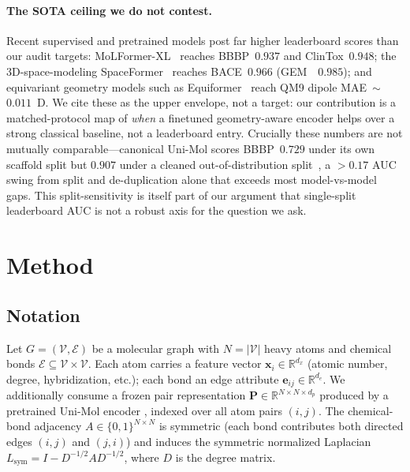 \documentclass[sigconf,nonacm,anonymous,review]{acmart}
\begin{document}
\paragraph{The SOTA ceiling we do not contest.}
Recent supervised and pretrained models post far higher leaderboard scores than our audit targets: MoLFormer-XL~\cite{ross2022molformer} reaches BBBP~$0.937$ and ClinTox~$0.948$; the 3D-space-modeling SpaceFormer~\cite{lu2025spaceformer} reaches BACE~$0.966$ (GEM~\cite{fang2022gem}~$0.985$); and equivariant geometry models such as Equiformer~\cite{liao2023equiformer} reach QM9 dipole MAE~$\sim$$0.011$~D. We cite these as the upper envelope, not a target: our contribution is a matched-protocol map of \emph{when} a finetuned geometry-aware encoder helps over a strong classical baseline, not a leaderboard entry. Crucially these numbers are not mutually comparable---canonical Uni-Mol scores BBBP~$0.729$ under its own scaffold split but $0.907$ under a cleaned out-of-distribution split~\cite{lu2025spaceformer}, a $>$$0.17$ AUC swing from split and de-duplication alone that exceeds most model-vs-model gaps. This split-sensitivity is itself part of our argument that single-split leaderboard AUC is not a robust axis for the question we ask.

\section{Method}
\label{sec:method}

\subsection{Notation}
Let $G=(\mathcal{V},\mathcal{E})$ be a molecular graph with $N=|\mathcal{V}|$ heavy atoms and chemical bonds $\mathcal{E}\subseteq\mathcal{V}\times\mathcal{V}$. Each atom carries a feature vector $\mathbf{x}_i\in\mathbb{R}^{d_x}$ (atomic number, degree, hybridization, etc.); each bond an edge attribute $\mathbf{e}_{ij}\in\mathbb{R}^{d_e}$. We additionally consume a frozen pair representation $\mathbf{P}\in\mathbb{R}^{N\times N\times d_p}$ produced by a pretrained Uni-Mol encoder \citep{zhou2023unimol}, indexed over all atom pairs $(i,j)$. The chemical-bond adjacency $A\in\{0,1\}^{N\times N}$ is symmetric (each bond contributes both directed edges $(i,j)$ and $(j,i)$) and induces the symmetric normalized Laplacian $L_{\mathrm{sym}}=I-D^{-1/2}AD^{-1/2}$, where $D$ is the degree matrix.
\end{document}
